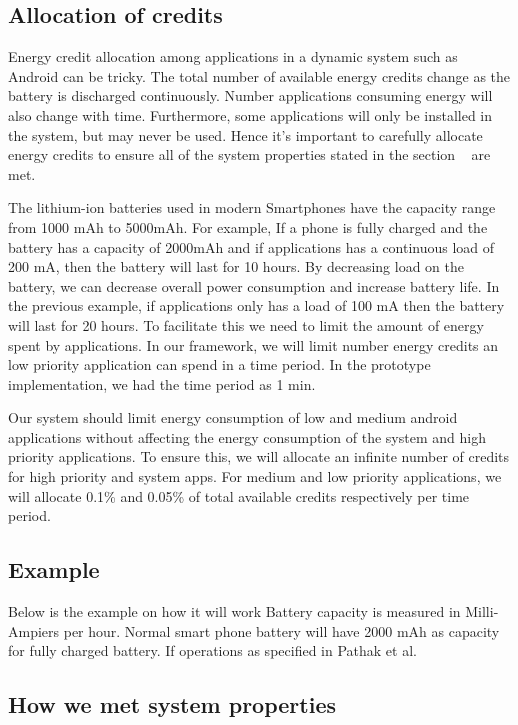\subsection{ Allocation of credits }

Energy credit allocation among applications in a dynamic system such as Android can be tricky. The total number of available energy credits change as the battery is discharged continuously. Number applications consuming energy will also change with time. Furthermore, some applications will only be installed in the system, but may never be used. Hence it's important to carefully allocate energy credits to ensure all of the system properties stated in the section ~\cite{motivation}  are met.

The lithium-ion batteries used in modern Smartphones have the capacity range from 1000 mAh to 5000mAh. For example, If a phone is fully charged and the battery has a capacity of 2000mAh and if applications has a continuous load of 200 mA, then the battery will last for 10 hours. By decreasing load on the battery, we can decrease overall power consumption and increase battery life. In the previous example, if applications only has a load of 100 mA then the battery will last for 20 hours.  To facilitate this we need to limit the amount of energy spent by applications. In our framework, we will limit number energy credits an low priority application can spend in a time period. In the prototype implementation, we had the time period as 1 min.

Our system should limit energy consumption of low and medium android applications without affecting the energy consumption of the system and high priority applications. To ensure this, we will allocate an infinite number of credits for high priority and system apps. For medium and low priority applications, we will allocate 0.1\% and 0.05\% of total available credits respectively per time period. 

\subsection{Example}
Below is the example on how it will work
Battery capacity is measured in Milli-Ampiers per hour. Normal smart phone battery will have 2000 mAh as capacity for fully charged battery. If operations as specified in Pathak et al. 



\subsection{How we met system properties}

